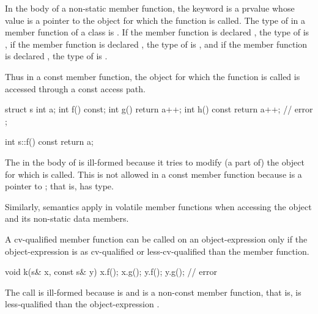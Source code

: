 \pnum
{}%
In the body of a non-static member function, the
keyword  is a prvalue whose value is
a pointer to the object for which the function is called.
%
The type of  in a member function of a class  is
.
If the member function is declared , the type of
 is  ,
if the member function is declared , the type of
 is  , and if the member function
is declared  , the type of  is
  .
\begin{note} Thus in a const member function, the object for which the function is
called is accessed through a const access path. \end{note}
\begin{example}

\begin{codeblock}
struct s {
  int a;
  int f() const;
  int g() { return a++; }
  int h() const { return a++; } // error
};

int s::f() const { return a; }
\end{codeblock}

The  in the body of  is ill-formed because it
tries to modify (a part of) the object for which  is
called. This is not allowed in a const member function because
 is a pointer to ; that is,  has
 type.
\end{example}

\pnum
Similarly,  semantics apply in
volatile member functions when accessing the object and its
non-static data members.

\pnum
A cv-qualified member function can be called on an
object-expression only if the object-expression is as
cv-qualified or less-cv-qualified than the member function.
\begin{example}

\begin{codeblock}
void k(s& x, const s& y) {
  x.f();
  x.g();
  y.f();
  y.g();                        // error
}
\end{codeblock}

The call  is ill-formed because  is 
and  is a non-const member function, that is,
 is less-qualified than the object-expression .
\end{example}

